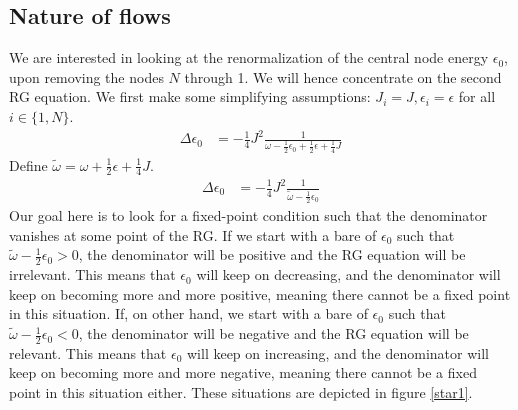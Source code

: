 \documentclass[12pt,twoside]{report}
\numberwithin{equation}{section}
\begin{document}
\subsection{Nature of flows}
We are interested in looking at the renormalization of the central node energy \(\epsilon_0\), upon removing the nodes \(N\) through 1. We will hence concentrate on the second RG equation. We first make some simplifying assumptions: \(J_i = J, \epsilon_i = \epsilon\) for all \(i\in\{1,N\}\).
\begin{equation}\begin{aligned}
	\label{stareq}
	\Delta \epsilon_0 &= -\frac{1}{4}J^2 \frac{1}{\omega - \frac{1}{2}\epsilon_0 + \frac{1}{2}\epsilon + \frac{1}{4}J}
\end{aligned}\end{equation}
Define \(\tilde\omega = \omega + \frac{1}{2}\epsilon + \frac{1}{4}J\).
\begin{equation}\begin{aligned}
	\Delta \epsilon_0 &= -\frac{1}{4}J^2 \frac{1}{\tilde \omega - \frac{1}{2}\epsilon_0}
\end{aligned}\end{equation}
Our goal here is to look for a fixed-point condition such that the denominator vanishes at some point of the RG. If we start with a bare of \(\epsilon_0\) such that \(\tilde \omega - \frac{1}{2}\epsilon_0 > 0\), the denominator will be positive and the RG equation will be irrelevant. This means that \(\epsilon_0\) will keep on decreasing, and the denominator will keep on becoming more and more positive, meaning there cannot be a fixed point in this situation.
\pb If, on other hand, we start with a bare of \(\epsilon_0\) such that \(\tilde \omega - \frac{1}{2}\epsilon_0 < 0\), the denominator will be negative and the RG equation will be relevant. This means that \(\epsilon_0\) will keep on increasing, and the denominator will keep on becoming more and more negative, meaning there cannot be a fixed point in this situation either. These situations are depicted in figure \ref{star1}.
\end{document}
